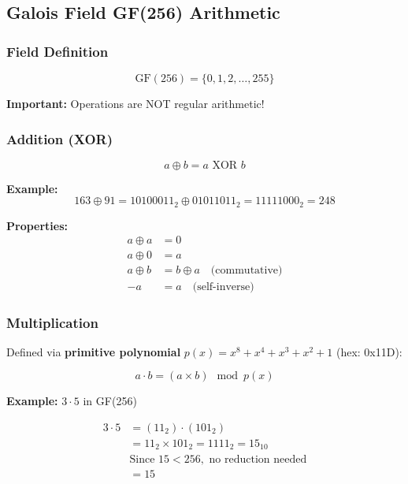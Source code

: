 \documentclass[11pt,a4paper]{article}
\begin{document}
\subsection{Galois Field GF(256) Arithmetic}

\subsubsection{Field Definition}

\begin{equation}
\text{GF}(256) = \{0, 1, 2, \ldots, 255\}
\end{equation}

\textbf{Important:} Operations are NOT regular arithmetic!

\subsubsection{Addition (XOR)}

\begin{equation}
a \oplus b = a \text{ XOR } b
\end{equation}

\textbf{Example:}
\begin{equation}
163 \oplus 91 = 10100011_2 \oplus 01011011_2 = 11111000_2 = 248
\end{equation}

\textbf{Properties:}
\begin{align}
a \oplus a &= 0 \\
a \oplus 0 &= a \\
a \oplus b &= b \oplus a \quad \text{(commutative)} \\
-a &= a \quad \text{(self-inverse)}
\end{align}

\subsubsection{Multiplication}

Defined via \textbf{primitive polynomial} $p(x) = x^8 + x^4 + x^3 + x^2 + 1$ (hex: 0x11D):

\begin{equation}
a \cdot b = (a \times b) \mod p(x)
\end{equation}

\textbf{Example:} $3 \cdot 5$ in GF(256)

\begin{align}
3 \cdot 5 &= (11_2) \cdot (101_2) \\
&= 11_2 \times 101_2 = 1111_2 = 15_{10} \\
&\text{Since } 15 < 256, \text{ no reduction needed} \\
&= 15
\end{align}
\end{document}
